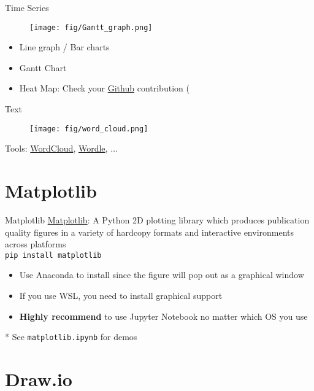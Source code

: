 \documentclass{../TexTemplate/myslide}
\begin{document}
\begin{frame}{Time Series}
\begin{figure}
\centering
\texttt{[image: fig/Gantt\_graph.png]}
\end{figure}
\begin{itemize}
	\item Line graph / Bar charts
	\item Gantt Chart
	\item Heat Map: Check your \href{https://github.com/}{Github} contribution (
\end{itemize}
\end{frame}

\begin{frame}{Text}
\begin{figure}
\centering
\texttt{[image: fig/word\_cloud.png]}
\end{figure}
Tools: \href{https://www.wordclouds.com/}{WordCloud}, \href{http://www.wordle.net/}{Wordle}, $\ldots$
\end{frame}

\section{Matplotlib}
\begin{frame}
\sectionpage
\end{frame}

\begin{frame}[fragile]{Matplotlib}
\href{https://matplotlib.org/index.html}{Matplotlib}: A Python 2D plotting library which produces publication quality figures in a variety of hardcopy formats and interactive environments across platforms\\
\bigskip
\verb'pip install matplotlib'
\begin{itemize}
	\item Use Anaconda to install since the figure will pop out as a graphical window
	\item If you use WSL, you need to install graphical support
	\item \textbf{Highly recommend} to use Jupyter Notebook no matter which OS you use
\end{itemize}
\bigskip
* See \verb'matplotlib.ipynb' for demos
\end{frame}

\section{Draw.io}
\begin{frame}
\sectionpage
\end{frame}
\end{document}
